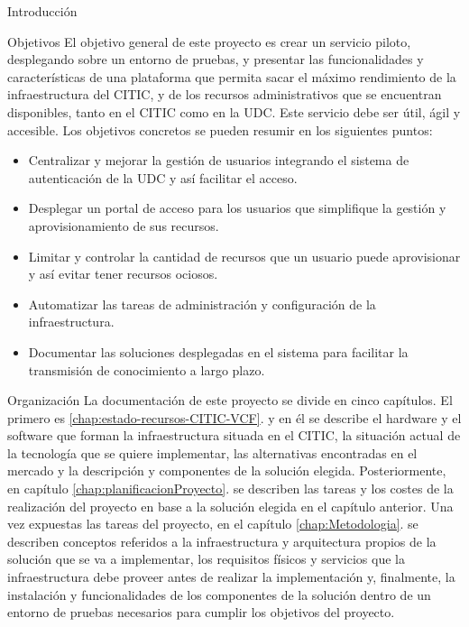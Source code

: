 \begin{chapter}{Introducción}
\begin{section}{Objetivos}
El objetivo general de este proyecto es crear un servicio piloto, desplegando sobre un entorno de pruebas, y presentar las funcionalidades y características de una plataforma que permita sacar el máximo rendimiento de la infraestructura del CITIC, y de los recursos administrativos que se encuentran disponibles, tanto en el CITIC como en la UDC. Este servicio debe ser útil, ágil y accesible.
Los objetivos concretos se pueden resumir en los siguientes puntos:
\begin{itemize}
    \item Centralizar y mejorar la gestión de usuarios integrando el sistema de autenticación de la UDC y así facilitar el acceso.
    \item Desplegar un portal de acceso para los usuarios que simplifique la gestión y aprovisionamiento de sus recursos.
    \item Limitar y controlar la cantidad de recursos que un usuario puede aprovisionar y así evitar tener recursos ociosos.
    \item Automatizar las tareas de administración y configuración de la infraestructura.
    \item Documentar las soluciones desplegadas en el sistema para facilitar la transmisión de conocimiento a largo plazo.
\end{itemize}
\end{section}

\begin{section}{Organización}
    La documentación de este proyecto se divide en cinco capítulos. El primero es \ref{chap:estado-recursos-CITIC-VCF}. y en él se describe el hardware y el software que forman la infraestructura situada en el CITIC, la situación actual de la tecnología que se quiere implementar, las alternativas encontradas en el mercado y la descripción y componentes de la solución elegida. Posteriormente, en capítulo \ref{chap:planificacionProyecto}. se describen las tareas y los costes de la realización del proyecto en base a la solución elegida en el capítulo anterior. Una vez expuestas las tareas del proyecto, en el capítulo \ref{chap:Metodologia}. se describen conceptos referidos a la infraestructura y arquitectura propios de la solución que se va a implementar, los requisitos físicos y servicios que la infraestructura debe proveer antes de realizar la implementación y, finalmente, la instalación y funcionalidades de los componentes de la solución dentro de un entorno de pruebas necesarios para cumplir los objetivos del proyecto.
\end{section}

\end{chapter}